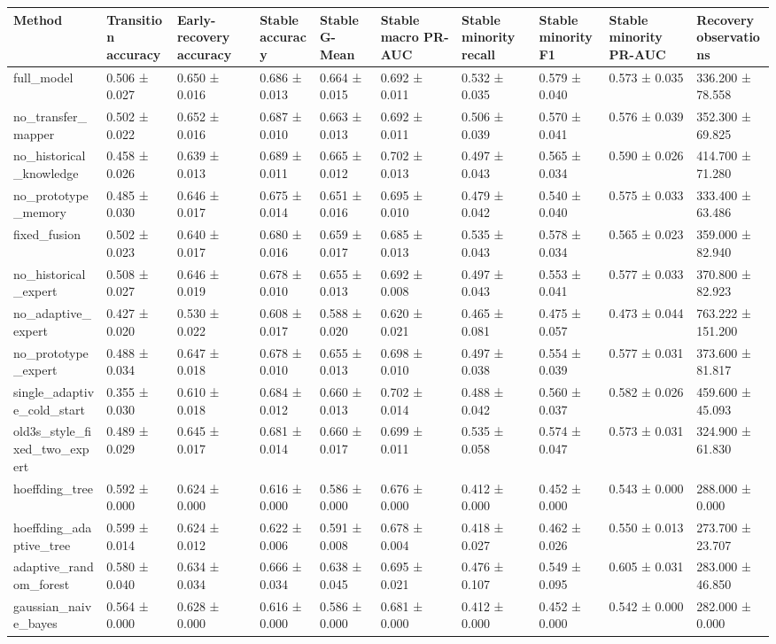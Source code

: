 \begin{tabular}{llllllllll}
\toprule
Method & Transition accuracy & Early-recovery accuracy & Stable accuracy & Stable G-Mean & Stable macro PR-AUC & Stable minority recall & Stable minority F1 & Stable minority PR-AUC & Recovery observations \\
\midrule
full\_model & 0.506 ± 0.027 & 0.650 ± 0.016 & 0.686 ± 0.013 & 0.664 ± 0.015 & 0.692 ± 0.011 & 0.532 ± 0.035 & 0.579 ± 0.040 & 0.573 ± 0.035 & 336.200 ± 78.558 \\
no\_transfer\_mapper & 0.502 ± 0.022 & 0.652 ± 0.016 & 0.687 ± 0.010 & 0.663 ± 0.013 & 0.692 ± 0.011 & 0.506 ± 0.039 & 0.570 ± 0.041 & 0.576 ± 0.039 & 352.300 ± 69.825 \\
no\_historical\_knowledge & 0.458 ± 0.026 & 0.639 ± 0.013 & 0.689 ± 0.011 & 0.665 ± 0.012 & 0.702 ± 0.013 & 0.497 ± 0.043 & 0.565 ± 0.034 & 0.590 ± 0.026 & 414.700 ± 71.280 \\
no\_prototype\_memory & 0.485 ± 0.030 & 0.646 ± 0.017 & 0.675 ± 0.014 & 0.651 ± 0.016 & 0.695 ± 0.010 & 0.479 ± 0.042 & 0.540 ± 0.040 & 0.575 ± 0.033 & 333.400 ± 63.486 \\
fixed\_fusion & 0.502 ± 0.023 & 0.640 ± 0.017 & 0.680 ± 0.016 & 0.659 ± 0.017 & 0.685 ± 0.013 & 0.535 ± 0.043 & 0.578 ± 0.034 & 0.565 ± 0.023 & 359.000 ± 82.940 \\
no\_historical\_expert & 0.508 ± 0.027 & 0.646 ± 0.019 & 0.678 ± 0.010 & 0.655 ± 0.013 & 0.692 ± 0.008 & 0.497 ± 0.043 & 0.553 ± 0.041 & 0.577 ± 0.033 & 370.800 ± 82.923 \\
no\_adaptive\_expert & 0.427 ± 0.020 & 0.530 ± 0.022 & 0.608 ± 0.017 & 0.588 ± 0.020 & 0.620 ± 0.021 & 0.465 ± 0.081 & 0.475 ± 0.057 & 0.473 ± 0.044 & 763.222 ± 151.200 \\
no\_prototype\_expert & 0.488 ± 0.034 & 0.647 ± 0.018 & 0.678 ± 0.010 & 0.655 ± 0.013 & 0.698 ± 0.010 & 0.497 ± 0.038 & 0.554 ± 0.039 & 0.577 ± 0.031 & 373.600 ± 81.817 \\
single\_adaptive\_cold\_start & 0.355 ± 0.030 & 0.610 ± 0.018 & 0.684 ± 0.012 & 0.660 ± 0.013 & 0.702 ± 0.014 & 0.488 ± 0.042 & 0.560 ± 0.037 & 0.582 ± 0.026 & 459.600 ± 45.093 \\
old3s\_style\_fixed\_two\_expert & 0.489 ± 0.029 & 0.645 ± 0.017 & 0.681 ± 0.014 & 0.660 ± 0.017 & 0.699 ± 0.011 & 0.535 ± 0.058 & 0.574 ± 0.047 & 0.573 ± 0.031 & 324.900 ± 61.830 \\
hoeffding\_tree & 0.592 ± 0.000 & 0.624 ± 0.000 & 0.616 ± 0.000 & 0.586 ± 0.000 & 0.676 ± 0.000 & 0.412 ± 0.000 & 0.452 ± 0.000 & 0.543 ± 0.000 & 288.000 ± 0.000 \\
hoeffding\_adaptive\_tree & 0.599 ± 0.014 & 0.624 ± 0.012 & 0.622 ± 0.006 & 0.591 ± 0.008 & 0.678 ± 0.004 & 0.418 ± 0.027 & 0.462 ± 0.026 & 0.550 ± 0.013 & 273.700 ± 23.707 \\
adaptive\_random\_forest & 0.580 ± 0.040 & 0.634 ± 0.034 & 0.666 ± 0.034 & 0.638 ± 0.045 & 0.695 ± 0.021 & 0.476 ± 0.107 & 0.549 ± 0.095 & 0.605 ± 0.031 & 283.000 ± 46.850 \\
gaussian\_naive\_bayes & 0.564 ± 0.000 & 0.628 ± 0.000 & 0.616 ± 0.000 & 0.586 ± 0.000 & 0.681 ± 0.000 & 0.412 ± 0.000 & 0.452 ± 0.000 & 0.542 ± 0.000 & 282.000 ± 0.000 \\
\bottomrule
\end{tabular}
